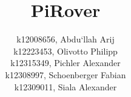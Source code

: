 \documentclass[12pt]{article}
\begin{document}
    \title{PiRover}

    \date{}
    \author{
        k12008656, Abdu`llah Arij\\
        k12223453, Olivotto Philipp\\
        k12315349, Pichler Alexander\\
        k12308997, Schoenberger Fabian\\
        k12309011, Siala Alexander
    }

    \maketitle
    \tableofcontents

    \newpage

    
    
    
    
    
    
    
\end{document}
